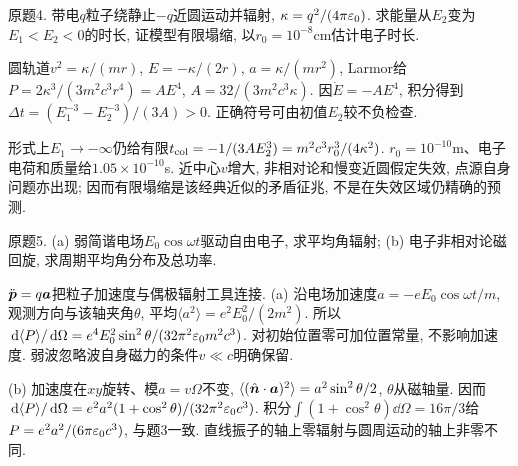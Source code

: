\begin{exercise}
原题4. 带电$q$粒子绕静止$-q$近圆运动并辐射, $\kappa=q^2/(4\pi\varepsilon_0)$. 求能量从$E_2$变为$E_1<E_2<0$的时长, 证模型有限塌缩, 以$r_0=10^{-8}$cm估计电子时长.
\end{exercise}
\begin{solution}
圆轨道$v^2=\kappa/(mr)$, $E=-\kappa/(2r)$, $a=\kappa/(mr^2)$, Larmor给$P=2\kappa^3/(3m^2c^3r^4)=AE^4$, $A=32/(3m^2c^3\kappa)$. 因$\dot E=-AE^4$, 积分得到$\Delta t=(E_1^{-3}-E_2^{-3})/(3A)>0$. 正确符号可由初值$E_2$较不负检查.

形式上$E_1\to-\infty$仍给有限$t_{\rm col}=-1/(3AE_2^3)=m^2c^3r_0^3/(4\kappa^2)$. $r_0=10^{-10}$m、电子电荷和质量给$1.05\times10^{-10}$s. 近中心$v$增大, 非相对论和慢变近圆假定失效, 点源自身问题亦出现; 因而有限塌缩是该经典近似的矛盾征兆, 不是在失效区域仍精确的预测.
\end{solution}
\begin{exercise}
原题5. (a) 弱简谐电场$E_0\cos\omega t$驱动自由电子, 求平均角辐射; (b) 电子非相对论磁回旋, 求周期平均角分布及总功率.
\end{exercise}
\begin{solution}
$\ddot{\boldsymbol{p}}=q\boldsymbol{a}$把粒子加速度与偶极辐射工具连接. (a) 沿电场加速度$a=-eE_0\cos\omega t/m$, 观测方向与该轴夹角$\theta$, 平均$\langle a^2\rangle=e^2E_0^2/(2m^2)$. 所以$\,\mathrm d\langle P\rangle/\,\mathrm d\Omega=e^4E_0^2\sin^2\theta/(32\pi^2\varepsilon_0 m^2c^3)$. 对初始位置零可加位置常量, 不影响加速度. 弱波忽略波自身磁力的条件$v\ll c$明确保留.

(b) 加速度在$xy$旋转、模$a=v\Omega$不变, $\langle(\hat{\boldsymbol{n}}\cdot\boldsymbol{a})^2\rangle=a^2\sin^2\theta/2$, $\theta$从磁轴量. 因而$\,\mathrm d\langle P\rangle/\,\mathrm d\Omega=e^2a^2(1+\cos^2\theta)/(32\pi^2\varepsilon_0 c^3)$. 积分$\int(1+\cos^2\theta)\dd\Omega=16\pi/3$给$P=e^2a^2/(6\pi\varepsilon_0 c^3)$, 与题3一致. 直线振子的轴上零辐射与圆周运动的轴上非零不同.
\end{solution}
